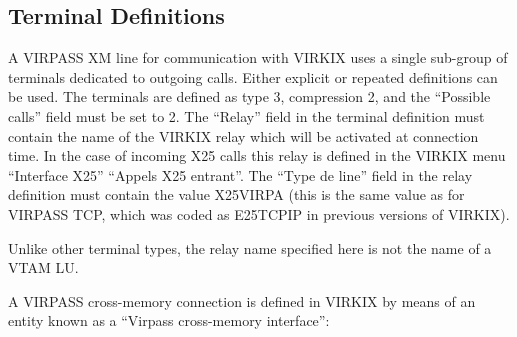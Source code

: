\documentclass[letterpaper,10pt,english]{sphinxmanual}
\begin{document}
\subsection{Terminal Definitions}
\label{\detokenize{connectivity_guide:index-50}}\label{\detokenize{connectivity_guide:id21}}
A VIRPASS XM line for communication with VIRKIX uses a single sub-group of terminals dedicated to outgoing calls. Either explicit or repeated definitions can be used. The terminals are defined as type 3, compression 2, and the “Possible calls” field must be set to 2. The “Relay” field in the terminal definition must contain the name of the VIRKIX relay which will be activated at connection time. In the case of incoming X25 calls this relay is defined in the VIRKIX menu “Interface X25” \textendash{} “Appels X25 entrant”. The “Type de line” field in the relay definition must contain the value X25VIRPA (this is the same value as for VIRPASS TCP, which was coded as E25TCPIP in previous versions of VIRKIX).

Unlike other terminal types, the relay name specified here is not the name of a VTAM LU.


A VIRPASS cross-memory connection is defined in VIRKIX by means of an entity known as a “Virpass cross-memory interface”:
\end{document}

